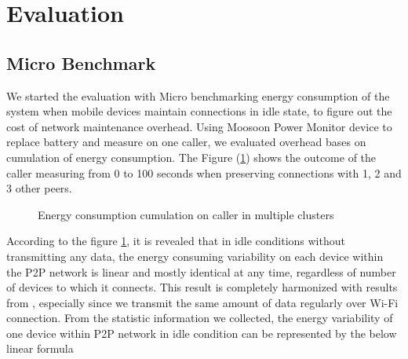 \documentclass[conference]{IEEEtran}
\begin{document}
\section{Evaluation}

\subsection{Micro Benchmark}
We started the evaluation with Micro benchmarking energy consumption of the system when mobile devices maintain connections in idle state, to figure out the cost of network maintenance overhead. Using Moosoon Power Monitor device \cite{moosoon} to replace battery and measure on one caller, we evaluated overhead bases on cumulation of energy consumption. The Figure (\ref{fig:microb_24}) shows the outcome of the caller measuring from 0 to 100 seconds when preserving connections with 1, 2 and 3 other peers. 

\begin{figure}[H]
	\hspace*{-0.15cm}
	\caption{Energy consumption cumulation on caller in multiple clusters}
	\label{fig:microb_24}
\end{figure}

According to the figure \ref{fig:microb_24}, it is revealed that in idle conditions without transmitting any data, the energy consuming variability on each device within the P2P network is linear and mostly identical at any time, regardless of number of devices to which it connects. This result is completely harmonized with results from \cite{wifi_energy}, especially since we transmit the same amount of data regularly over Wi-Fi connection. From the statistic information we collected, the energy variability of one device within P2P network in idle condition can be represented by the below linear formula
\end{document}
